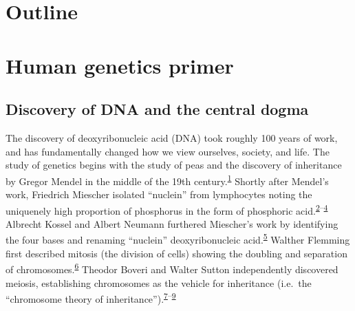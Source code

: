 \documentclass[11pt,letterpaper]{book}
\begin{document}
\hypertarget{outline}{%
\section{Outline}\label{outline}}

\hypertarget{human-genetics-primer}{%
\section{Human genetics primer}\label{human-genetics-primer}}

\hypertarget{discovery-of-dna-and-the-central-dogma}{%
\subsection{Discovery of DNA and the central dogma}\label{discovery-of-dna-and-the-central-dogma}}

The discovery of deoxyribonucleic acid (DNA) took roughly 100 years of work, and has fundamentally changed how we view ourselves, society, and life.
The study of genetics begins with the study of peas and the discovery of inheritance by Gregor Mendel in the middle of the 19th century.\textsuperscript{\protect\hyperlink{ref-mendel:1866aa}{1}}
Shortly after Mendel's work, Friedrich Miescher isolated ``nuclein'' from lymphocytes noting the uniquenely high proportion of phosphorus in the form of phosphoric acid.\textsuperscript{\protect\hyperlink{ref-miescher:1871aa}{2}--\protect\hyperlink{ref-miescher:1874ab}{4}}
Albrecht Kossel and Albert Neumann furthered Miescher's work by identifying the four bases and renaming ``nuclein'' deoxyribonucleic acid.\textsuperscript{\protect\hyperlink{ref-kossel:1893aa}{5}}
Walther Flemming first described mitosis (the division of cells) showing the doubling and separation of chromosomes.\textsuperscript{\protect\hyperlink{ref-flemming:1878aa}{6}}
Theodor Boveri and Walter Sutton independently discovered meiosis, establishing chromosomes as the vehicle for inheritance (i.e.~the ``chromosome theory of inheritance'').\textsuperscript{\protect\hyperlink{ref-boveri:1902aa}{7}--\protect\hyperlink{ref-sutton:1903aa}{9}}
\end{document}
